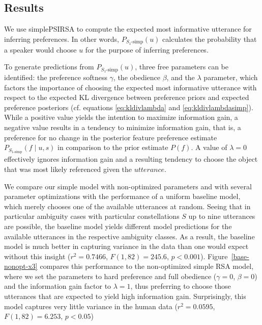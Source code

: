 \documentclass[11pt,a4paper]{article}
\newcommand{\gcs}[1]{\textcolor{blue}{[gcs: #1]}}
\begin{document}
\subsection{Results}

We use simplePSIRSA to compute the expected most informative utterance for inferring preferences.
In other words, $P_{S_1\textrm{-simp}}(u)$ calculates the probability that a speaker would choose $u$ for the purpose of inferring preferences.

To generate predictions from $P_{S_1\textrm{-simp}}(u)$, three free parameters can be identified:
the preference softness $\gamma$, the obedience $\beta$, and the $\lambda$ parameter, which factors the importance of choosing the expected most informative utterance with respect to the expected KL divergence between preference priors and expected preference posteriors 
(cf. equations \ref{eq:kldivlambda} and \ref{eq:kldivlambdasimp}). 
While a positive value yields the intention to maximize information gain, 
a negative value results in a tendency to minimize information gain, that is, a preference for no change in the posterior feature preference estimate $P_{S_{1\textrm{-simp}}}(f\mid u,s)$ in comparison to the prior estimate $P(f)$. 
A value of $\lambda=0$ effectively ignores information gain and a resulting tendency to choose the object that was most likely referenced given the $utterance$.



We compare our simple model with non-optimized parameters and with several parameter optimizations with the performance of a uniform baseline model, which merely chooses one of the available utterances at random. 
Seeing that in particular ambiguity cases with particular constellations $S$ up to nine utterances are possible, the baseline model yields different model predictions for the available utterances in the respective ambiguity classes. 
As a result, the baseline model is much better in capturing variance in the data than one would expect without this insight ($r^2=0.7466$, $F(1,82) = 245.6$, $p<0.001$).
Figure~\ref{base-nonopt-x3} compares this performance to the non-optimized simple RSA model, where we set the parameters to hard preference and full obedience ($\gamma=0$, $\beta=0$) and the information gain factor to $\lambda=1$, thus preferring to choose those utterances that are expected to yield high information gain. 
Surprisingly, this model captures very little variance in
the human data ($r^2=0.0595$, $F(1,82) = 6.253$, $p  < 0.05$)
\end{document}
